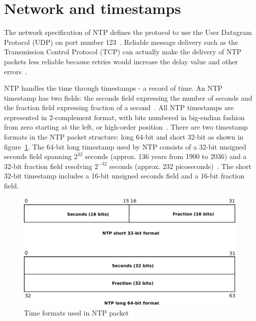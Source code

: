 
\section{Network and timestamps}\label{sec:ntp-network}
The network specification of NTP defines
the protocol to use the User Datagram Protocol (UDP) on port number 123~\cite{ianna-ports,rfc5905}.
Reliable message delivery such as the Transmission Control Protocol (TCP)
can actually make the delivery of
NTP packets less reliable because retries
would increase the delay value and other errors~\cite{rfc5905}.

NTP handles the time through timestamps - a record of time.
An NTP timestamp has two fields: the seconds field expressing the number of seconds
and the fraction field expressing fraction of a second~\cite{rfc5905}.
All NTP timestamps are represented in 2-complement format, with
bits numbered in big-endian fashion from zero starting at the left, or high-order position~\cite{rfc5905}.
There are two timestamp formats in the NTP packet structure:
long 64-bit and short 32-bit as shown in figure~\ref{fig:ntp-timestamps}.
The 64-bit long timestamp used by NTP consists of a 32-bit unsigned seconds
field spanning $2^{32}$ seconds (approx. 136 years from 1900 to 2036) and a 32-bit fraction field resolving
$2^{-32}$ seconds (approx. 232 picoseconds)~\cite{rfc5905}.
The short 32-bit timestamp includes a 16-bit unsigned seconds field
and a 16-bit fraction field.

\begin{figure}
	\centering
	\includegraphics[width=13cm,keepaspectratio]{fig/ntp-timestamps.pdf}
	\caption{Time formats used in NTP packet}
	\label{fig:ntp-timestamps}
	\bigskip
\end{figure}


